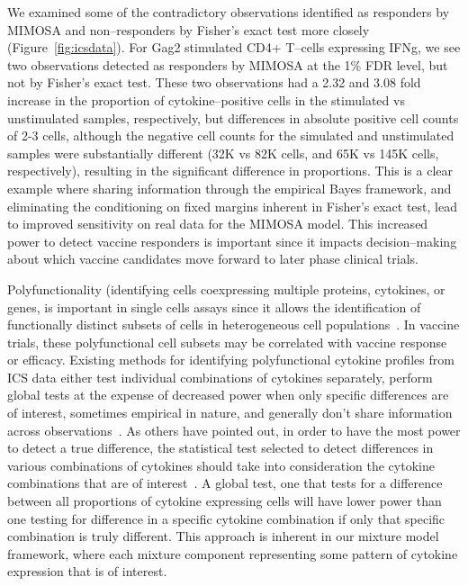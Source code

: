 \documentclass[11pt]{article}
\begin{document}
We examined some of the contradictory observations identified as responders by MIMOSA and non--responders by Fisher's exact test more closely (Figure~\ref{fig:icsdata}).  For Gag2 stimulated CD4+ T--cells expressing IFNg, we see two observations detected as responders by MIMOSA at the 1\% FDR level, but not by Fisher's exact test. These two observations had a 2.32 and 3.08 fold increase in the proportion of cytokine--positive cells in the stimulated vs unstimulated samples, respectively, but differences in absolute positive cell counts of 2-3 cells, although the negative cell counts for the simulated and unstimulated samples were substantially different (32K vs 82K cells, and 65K vs 145K cells, respectively), resulting in the significant difference in proportions. This is a clear example where sharing information through the empirical Bayes framework, and eliminating the conditioning on fixed margins inherent in Fisher's exact test, lead to improved sensitivity on real data for the MIMOSA model. This increased power to detect vaccine responders is important since it impacts decision--making about which vaccine candidates move forward to later phase clinical trials.

Polyfunctionality (identifying cells coexpressing multiple proteins, cytokines, or genes, is important in single cells assays since it allows the identification of functionally distinct subsets of cells in heterogeneous cell populations~\cite{Milush:2009bz}. In vaccine trials, these polyfunctional cell subsets may be correlated with vaccine response or efficacy. Existing methods for identifying polyfunctional cytokine profiles from ICS data either test individual combinations of cytokines separately, perform global tests at the expense of decreased power when only specific differences are of interest, sometimes  empirical in nature, and generally don't share information across observations~\cite{Dittrich:2012bv,Trigona:2003,Sinclair:2004hs,Horton:2007tsa,Proschan:2009ks,Nason:2006dx}. As others have pointed out, in order to have the most power to detect a true difference, the statistical test selected to detect differences in various combinations of cytokines should take into consideration the cytokine combinations that are of interest~\cite{Nason:2006dx}. A global test, one that tests for a difference between all proportions of cytokine expressing cells will have lower power than one testing for difference in a specific cytokine combination if only that specific combination is truly different. This approach is inherent in our mixture model framework, where each mixture component representing some pattern of cytokine expression that is of interest.
\end{document}
